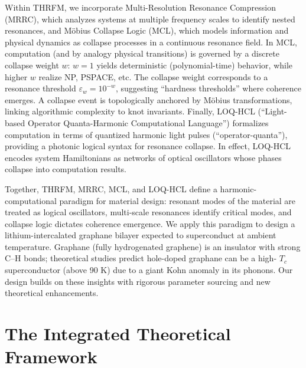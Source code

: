 \documentclass[11pt,a4paper]{article}
\begin{document}
Within THRFM, we incorporate Multi-Resolution Resonance Compression (MRRC), which analyzes systems at multiple frequency scales to identify nested resonances, and Möbius Collapse Logic (MCL), which models information and physical dynamics as collapse processes in a continuous resonance field. In MCL, computation (and by analogy physical transitions) is governed by a discrete collapse weight 
$w$: 
$w=1$ yields deterministic (polynomial-time) behavior, while higher 
$w$ realize NP, PSPACE, etc. The collapse weight corresponds to a resonance threshold 
$\varepsilon_w = 10^{-w}$, suggesting “hardness thresholds” where coherence emerges. A collapse event is topologically anchored by Möbius transformations, linking algorithmic complexity to knot invariants. Finally, LOQ-HCL (“Light-based Operator Quanta-Harmonic Computational Language”) formalizes computation in terms of quantized harmonic light pulses (“operator-quanta”), providing a photonic logical syntax for resonance collapse. In effect, LOQ-HCL encodes system Hamiltonians as networks of optical oscillators whose phases collapse into computation results.

Together, THRFM, MRRC, MCL, and LOQ-HCL define a harmonic-computational paradigm for material design: resonant modes of the material are treated as logical oscillators, multi-scale resonances identify critical modes, and collapse logic dictates coherence emergence. We apply this paradigm to design a lithium-intercalated graphane bilayer expected to superconduct at ambient temperature. Graphane (fully hydrogenated graphene) is an insulator with strong C–H bonds; theoretical studies predict hole-doped graphane can be a high-
$T_c$ superconductor (above 90 K) due to a giant Kohn anomaly in its phonons. Our design builds on these insights with rigorous parameter sourcing and new theoretical enhancements.

\section{The Integrated Theoretical Framework} 
\label{sec:integrated_theoretical_framework}
\end{document}
